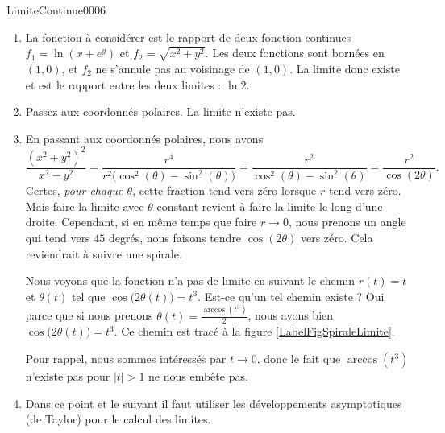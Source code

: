 \begin{corrige}{LimiteContinue0006}

  \begin{enumerate}
  \item La fonction à considérer est le rapport de deux fonction continues $f_1=\ln (x+e^y)$ et  $f_2=\sqrt{x^2+y^2}$. Les deux fonctions sont bornées en $(1,0)$, et $f_2$ ne s'annule pas au voisinage de $(1,0)$. La limite donc existe et est le rapport entre les deux limites : $\ln 2 $.
    \item Passez aux coordonnés polaires. La limite n'existe pas. 

      \item 
		En passant aux coordonnés polaires, nous avons
		\begin{equation}
			\frac{ (x^2+y^2)^2 }{ x^2-y^2 }=\frac{ r^4 }{ r^2\big( \cos^2(\theta)-\sin^2(\theta) \big) }=\frac{ r^2 }{ \cos^2(\theta)-\sin^2(\theta) }=\frac{ r^2 }{ \cos(2\theta) }.
		\end{equation}
		Certes, \emph{pour chaque $\theta$}, cette fraction tend vers zéro lorsque $r$ tend vers zéro. Mais faire la limite avec $\theta$ constant revient à faire la limite le long d'une droite. Cependant, si en même temps que faire $r\to 0$, nous prenons un angle qui tend vers $45$ degrés, nous faisons tendre $\cos(2\theta)$ vers zéro. Cela reviendrait à suivre une spirale.

		Nous voyons que la fonction n'a pas de limite en suivant le chemin $r(t)=t$ et $\theta(t)$ tel que $\cos\big( 2\theta(t) \big)=t^3$. Est-ce qu'un tel chemin existe ? Oui parce que si nous prenons $\theta(t)=\frac{ \arccos(t^3) }{2}$, nous avons bien $\cos\big( 2\theta(t) \big)=t^3$. Ce chemin est tracé à la figure \ref{LabelFigSpiraleLimite}.
\newcommand{\CaptionFigSpiraleLimite}{Un chemin possible le long duquel calculer une limite. $r(t)=t$, $\theta(t)=\arccos(t^3)/2$.}


		
		Pour rappel, nous sommes intéressés par $t\to 0$, donc le fait que $\arccos(t^3)$ n'existe pas pour $| t |>1$ ne nous embête pas.

        \item Dans ce point et le suivant il faut utiliser les développements asymptotiques (de Taylor) pour le calcul des limites.
          

\end{enumerate}
\end{corrige}
